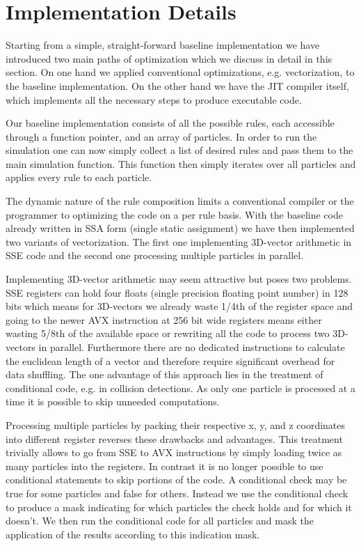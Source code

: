 \section{Implementation Details}\label{sec:method}

Starting from a simple, straight-forward baseline implementation we have introduced two main paths of optimization which we discuss in detail in this section. On one hand we applied conventional optimizations, e.g. vectorization, to the baseline implementation. On the other hand we have the JIT compiler itself, which implements all the necessary steps to produce executable code.

Our baseline implementation consists of all the possible rules, each accessible through a function pointer, and an array of particles. In order to run the simulation one can now simply collect a list of desired rules and pass them to the main simulation function. This function then simply iterates over all particles and applies every rule to each particle.

The dynamic nature of the rule composition limits a conventional compiler or the programmer to optimizing the code on a per rule basis. With the baseline code already written in SSA form (single static assignment) we have then implemented two variants of vectorization. The first one implementing 3D-vector arithmetic in SSE code and the second one processing multiple particles in parallel.

Implementing 3D-vector arithmetic may seem attractive but poses two problems. SSE registers can hold four floats (single precision floating point number) in 128 bits which means for 3D-vectors we already waste 1/4th of the register space and going to the newer AVX instruction at 256 bit wide registers means either wasting 5/8th of the available space or rewriting all the code to process two 3D-vectors in parallel. Furthermore there are no dedicated instructions to calculate the euclidean length of a vector and therefore require significant overhead for data shuffling. The one advantage of this approach lies in the treatment of conditional code, e.g. in collision detections. As only one particle is processed at a time it is possible to skip unneeded computations.

Processing multiple particles by packing their respective x, y, and z coordinates into different register reverses these drawbacks and advantages. This treatment trivially allows to go from SSE to AVX instructions by simply loading twice as many particles into the registers. In contrast it is no longer possible to use conditional statements to skip portions of the code. A conditional check may be true for some particles and false for others. Instead we use the conditional check to produce a mask indicating for which particles the check holds and for which it doesn't. We then run the conditional code for all particles and mask the application of the results according to this indication mask.

